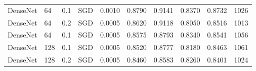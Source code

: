 \begin{landscape}
\begin{table}
\begin{tabular}{l|l|l|l|l|l|l|l|l|l}
    DenseNet & 64 & 0.1 & SGD & 0.0010 & 0.8790 & 0.9141 & 0.8370 & 0.8732 & 1026 \\
    DenseNet & 64 & 0.2 & SGD & 0.0005 & 0.8620 & 0.9118 & 0.8050 & 0.8516 & 1013 \\
    DenseNet & 64 & 0.1 & SGD & 0.0005 & 0.8575 & 0.8793 & 0.8340 & 0.8541 & 1056 \\
    DenseNet & 128 & 0.1 & SGD & 0.0005 & 0.8520 & 0.8777 & 0.8180 & 0.8463 & 1061 \\
    DenseNet & 128 & 0.2 & SGD & 0.0005 & 0.8460 & 0.8583 & 0.8260 & 0.8401 & 1024
    \end{tabular}
    \label{fig:densenet-results}
\end{table}
\end{landscape}